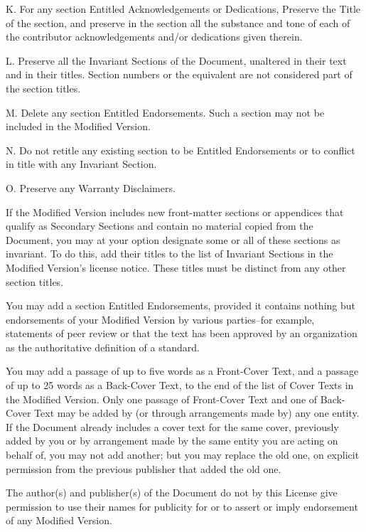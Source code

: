 K. For any section Entitled \textquotedbl{}Acknowledgements\textquotedbl{}
or \textquotedbl{}Dedications\textquotedbl{}, Preserve the Title of
the section, and preserve in the section all the substance and tone
of each of the contributor acknowledgements and/or dedications given
therein. 

L. Preserve all the Invariant Sections of the Document, unaltered
in their text and in their titles. Section numbers or the equivalent
are not considered part of the section titles. 

M. Delete any section Entitled \textquotedbl{}Endorsements\textquotedbl{}.
Such a section may not be included in the Modified Version. 

N. Do not retitle any existing section to be Entitled \textquotedbl{}Endorsements\textquotedbl{}
or to conflict in title with any Invariant Section. 

O. Preserve any Warranty Disclaimers. 

If the Modified Version includes new front-matter sections or appendices
that qualify as Secondary Sections and contain no material copied
from the Document, you may at your option designate some or all of
these sections as invariant. To do this, add their titles to the list
of Invariant Sections in the Modified Version's license notice. These
titles must be distinct from any other section titles.

You may add a section Entitled \textquotedbl{}Endorsements\textquotedbl{},
provided it contains nothing but endorsements of your Modified Version
by various parties--for example, statements of peer review or that
the text has been approved by an organization as the authoritative
definition of a standard.

You may add a passage of up to five words as a Front-Cover Text, and
a passage of up to 25 words as a Back-Cover Text, to the end of the
list of Cover Texts in the Modified Version. Only one passage of Front-Cover
Text and one of Back-Cover Text may be added by (or through arrangements
made by) any one entity. If the Document already includes a cover
text for the same cover, previously added by you or by arrangement
made by the same entity you are acting on behalf of, you may not add
another; but you may replace the old one, on explicit permission from
the previous publisher that added the old one.

The author(s) and publisher(s) of the Document do not by this License
give permission to use their names for publicity for or to assert
or imply endorsement of any Modified Version.

